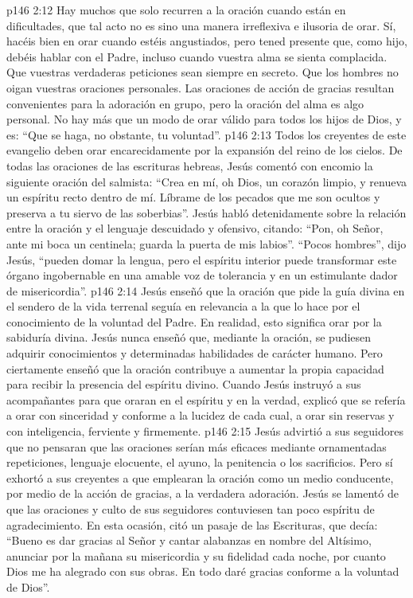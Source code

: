 \vs p146 2:12 Hay muchos que solo recurren a la oración cuando están en dificultades, que tal acto no es sino una manera irreflexiva e ilusoria de orar. Sí, hacéis bien en orar cuando estéis angustiados, pero tened presente que, como hijo, debéis hablar con el Padre, incluso cuando vuestra alma se sienta complacida. Que vuestras verdaderas peticiones sean siempre en secreto. Que los hombres no oigan vuestras oraciones personales. Las oraciones de acción de gracias resultan convenientes para la adoración en grupo, pero la oración del alma es algo personal. No hay más que un modo de orar válido para todos los hijos de Dios, y es: “Que se haga, no obstante, tu voluntad”.
\vs p146 2:13 Todos los creyentes de este evangelio deben orar encarecidamente por la expansión del reino de los cielos. De todas las oraciones de las escrituras hebreas, Jesús comentó con encomio la siguiente oración del salmista: “Crea en mí, oh Dios, un corazón limpio, y renueva un espíritu recto dentro de mí. Líbrame de los pecados que me son ocultos y preserva a tu siervo de las soberbias”. Jesús habló detenidamente sobre la relación entre la oración y el lenguaje descuidado y ofensivo, citando: “Pon, oh Señor, ante mi boca un centinela; guarda la puerta de mis labios”. “Pocos hombres”, dijo Jesús, “pueden domar la lengua, pero el espíritu interior puede transformar este órgano ingobernable en una amable voz de tolerancia y en un estimulante dador de misericordia”.
\vs p146 2:14 Jesús enseñó que la oración que pide la guía divina en el sendero de la vida terrenal seguía en relevancia a la que lo hace por el conocimiento de la voluntad del Padre. En realidad, esto significa orar por la sabiduría divina. Jesús nunca enseñó que, mediante la oración, se pudiesen adquirir conocimientos y determinadas habilidades de carácter humano. Pero ciertamente enseñó que la oración contribuye a aumentar la propia capacidad para recibir la presencia del espíritu divino. Cuando Jesús instruyó a sus acompañantes para que oraran en el espíritu y en la verdad, explicó que se refería a orar con sinceridad y conforme a la lucidez de cada cual, a orar sin reservas y con inteligencia, ferviente y firmemente.
\vs p146 2:15 Jesús advirtió a sus seguidores que no pensaran que las oraciones serían más eficaces mediante ornamentadas repeticiones, lenguaje elocuente, el ayuno, la penitencia o los sacrificios. Pero sí exhortó a sus creyentes a que emplearan la oración como un medio conducente, por medio de la acción de gracias, a la verdadera adoración. Jesús se lamentó de que las oraciones y culto de sus seguidores contuviesen tan poco espíritu de agradecimiento. En esta ocasión, citó un pasaje de las Escrituras, que decía: “Bueno es dar gracias al Señor y cantar alabanzas en nombre del Altísimo, anunciar por la mañana su misericordia y su fidelidad cada noche, por cuanto Dios me ha alegrado con sus obras. En todo daré gracias conforme a la voluntad de Dios”.
